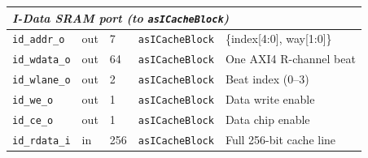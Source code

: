 \begin{table}[H]
\begin{tabularx}{\textwidth}{|l |l |l |l |X|}
  \hline
  \multicolumn{5}{|l|}{\textit{I-Data SRAM port (to \texttt{asICacheBlock})}} \\
  \hline
  \texttt{id\_addr\_o}  & out & 7  & \texttt{asICacheBlock} & \{index[4:0], way[1:0]\} \\
  \hline
  \texttt{id\_wdata\_o} & out & 64 & \texttt{asICacheBlock} & One AXI4 R-channel beat \\
  \hline
  \texttt{id\_wlane\_o} & out & 2  & \texttt{asICacheBlock} & Beat index (0--3) \\
  \hline
  \texttt{id\_we\_o}    & out & 1  & \texttt{asICacheBlock} & Data write enable \\
  \hline
  \texttt{id\_ce\_o}    & out & 1  & \texttt{asICacheBlock} & Data chip enable \\
  \hline
  \texttt{id\_rdata\_i} & in  & 256 & \texttt{asICacheBlock} & Full 256-bit cache line \\
  \hline
\end{tabularx}
\end{table}

